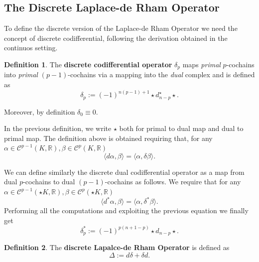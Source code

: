 \documentclass{article}
\theoremstyle{definition} %
\newtheorem{Def}{Definition}
\theoremstyle{plain} %
\theoremstyle{remark} %
\newcommand{\rr}{\mathbb{R}}
\begin{document}
\subsection{The Discrete Laplace-de Rham Operator}
To define the discrete version of the Laplace-de Rham Operator we need the concept of discrete codifferential, following the derivation obtained in the continuos setting.

 \begin{Def}
        The \textbf{discrete codifferential operator} $\delta_p$ maps \textsl{primal} $p$-cochains into \textsl{primal} $(p-1)$-cochains via a mapping into the \textsl{dual} complex and is defined as
        \begin{equation}
            \delta_p := (-1)^{n(p-1) + 1} \star d^\star_{n-p} \star.
        \end{equation}

        Moreover, by definition $\delta_0 \equiv 0$.
\end{Def}

In the previous definition, we write $\star$ both for primal to dual map and dual to primal map. The definition above is obtained requiring that, for any $\alpha \in \mathcal{C}^{p-1}(K, \rr), \beta \in \mathcal{C}^{p}(K, \rr)$
\begin{equation}
    \langle d\alpha, \beta  \rangle = \langle \alpha, \delta \beta \rangle.
\end{equation}

We can define similarly the discrete dual codifferential operator as a map from dual $p$-cochains to dual $(p-1)$-cochains as follows. We require that for any $\alpha \in \mathcal{C}^{p-1}(\star K, \rr), \beta \in \mathcal{C}^{p}(\star K, \rr)$
\begin{equation}
    \langle d^*\alpha, \beta  \rangle = \langle \alpha, \delta^* \beta \rangle.
\end{equation}
Performing all the computations and exploiting the previous equation we finally get
\begin{equation}
    \delta^*_p := (-1)^{p(n+1-p)} \star d_{n-p} \star.
\end{equation}

\begin{Def}
    The \textbf{discrete Lapalce-de Rham Operator} is defined as
    \begin{equation}
        \Delta := d\delta + \delta d.
    \end{equation}
\end{Def}
\end{document}
